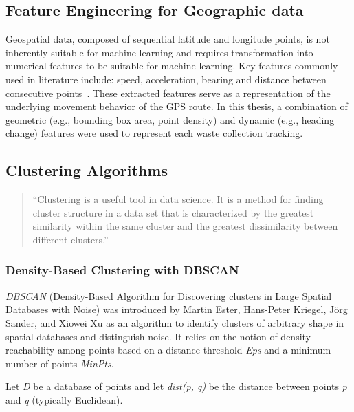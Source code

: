 \documentclass[a4paper,12pt,twoside]{scrreprt}
\begin{document}
\subsection{Feature Engineering for Geographic data}
Geospatial data, composed of sequential latitude and longitude points,
is not inherently suitable for machine learning and requires transformation
into numerical features to be suitable for machine learning.
Key features commonly used in literature include: speed, acceleration, bearing
and distance between consecutive points~\cite{etemad_predicting_2018}.
These extracted features serve as a representation of the underlying movement
behavior of the GPS route.
In this thesis, a combination of geometric (e.g., bounding box area, point
density) and dynamic (e.g., heading change) features were used to represent
each waste collection tracking.

\subsection{Clustering Algorithms}
\begin{quote}
  ``Clustering is a useful tool in data science. It is a method for
  finding cluster structure in a data set that is characterized by
  the greatest similarity within the same cluster and the
  greatest dissimilarity between different
  clusters.''\cite{sinaga_pdf_2024}
\end{quote}

\subsubsection{Density-Based Clustering with DBSCAN}

\textit{DBSCAN} (Density-Based Algorithm for Discovering clusters in Large
Spatial Databases with Noise) was
introduced by Martin Ester, Hans-Peter Kriegel, Jörg Sander, and Xiowei Xu as
an algorithm to
identify
clusters of arbitrary shape in spatial databases and distinguish noise. It
relies on the notion of density-reachability among points based on a distance
threshold \textit{Eps} and a minimum number of points
\textit{MinPts}.\cite{ester_density-based_nodate}

Let \textit{D} be a database of points and let \textit{dist(p, q)} be the
distance between points \textit{p} and \textit{q} (typically Euclidean).
\end{document}
